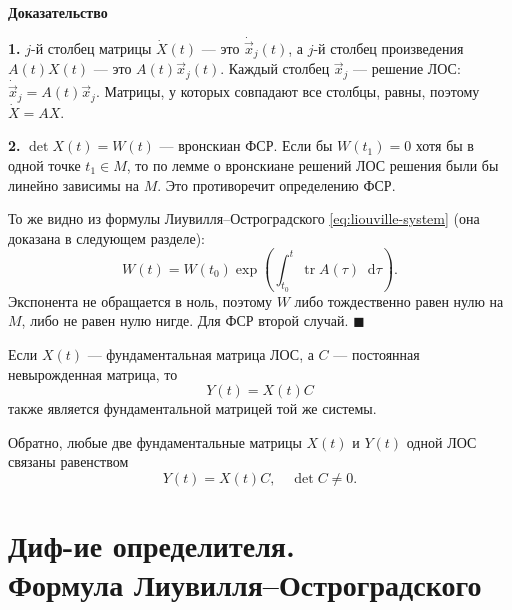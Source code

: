 \documentclass[12pt,a4paper]{article}
\numberwithin{equation}{section}
\newcommand{\vect}[1]{\vec{#1}}
\newcommand{\tr}{\operatorname{tr}}
\newcommand{\dd}{\mathop{}\!\mathrm{d}}
\renewenvironment{proof}[1][Доказательство]{\begin{center}\textbf{#1}\end{center}}{\hfill$\blacksquare$\par}
\begin{document}
\begin{proof}
\textbf{1.} \(j\)-й столбец матрицы \(\dot X(t)\) --- это \(\dot{\vect{x}}_j(t)\), а \(j\)-й столбец произведения \(A(t)X(t)\) --- это \(A(t)\vect{x}_j(t)\). Каждый столбец \(\vect{x}_j\) --- решение ЛОС: \(\dot{\vect{x}}_j=A(t)\vect{x}_j\). Матрицы, у которых совпадают все столбцы, равны, поэтому \(\dot X=AX\).

\textbf{2.} \(\det X(t)=W(t)\) --- вронскиан ФСР. Если бы \(W(t_1)=0\) хотя бы в одной точке \(t_1\in M\), то по лемме о вронскиане решений ЛОС решения были бы линейно зависимы на \(M\). Это противоречит определению ФСР.

То же видно из формулы Лиувилля--Остроградского \eqref{eq:liouville-system} (она доказана в следующем разделе):
\[
W(t)=W(t_0)\exp\left(\int_{t_0}^{t}\tr A(\tau)\dd\tau\right).
\]
Экспонента не обращается в ноль, поэтому \(W\) либо тождественно равен нулю на \(M\), либо не равен нулю нигде. Для ФСР второй случай.
\end{proof}

\begin{theoremHSE}
Если $X(t)$ --- фундаментальная матрица ЛОС, а $C$ --- постоянная невырожденная матрица, то
\[
Y(t)=X(t)C
\]
также является фундаментальной матрицей той же системы.

Обратно, любые две фундаментальные матрицы $X(t)$ и $Y(t)$ одной ЛОС связаны равенством
\[
Y(t)=X(t)C,
\quad \det C\neq0.
\]
\end{theoremHSE}

\section[Лиувилль-Остроградский для систем]{Диф-ие определителя.\\Формула Лиувилля--Остроградского}
\end{document}
